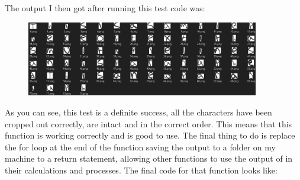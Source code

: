 \documentclass{report}
\begin{document}
The output I then got after running this test code was:
\begin{figure}[H]
    \centering
    \includegraphics[width = 4in]{Images/Development and Testing/Stage 6/Tests/Test 4 Output.png}
    \label{fig:Final Test Output}
\end{figure}
\noindent
As you can see, this test is a definite success, all the characters have been cropped out correctly, are intact and in the correct order. This means that this function is working correctly and is good to use. The final thing to do is replace the for loop at the end of the function saving the output to a folder on my machine to a return statement, allowing other functions to use the output of  in their calculations and processes. The final code for that function looks like:
\end{document}

